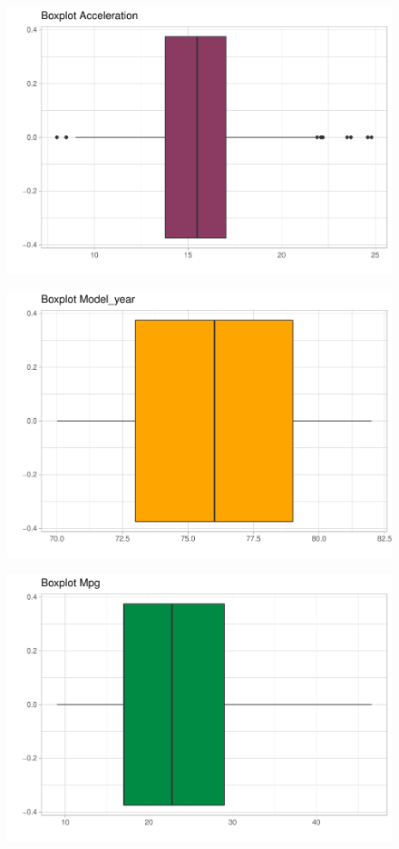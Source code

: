 \begin{figure}[H]\includegraphics[width=.9\linewidth]{img/EDA_files/figure-latex/unnamed-chunk-8-4} \caption{}\end{figure}
\begin{figure}[H]\includegraphics[width=.9\linewidth]{img/EDA_files/figure-latex/unnamed-chunk-8-5} \caption{}\end{figure}
\begin{figure}[H]\includegraphics[width=.9\linewidth]{img/EDA_files/figure-latex/unnamed-chunk-8-6} \caption{}\end{figure}

